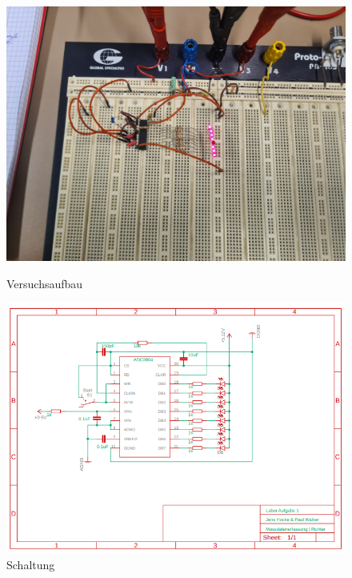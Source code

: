 \documentclass[12pt, a4paper, ngerman]{article}
\begin{document}
\begin{figure}%
  \centering
  \begin{minipage}[b]{0.49\textwidth}
    \includegraphics[width=\textwidth]{versuch_1_versuchsaufbau.jpeg}
    \caption{Versuchsaufbau}
    \label{abb:aufbau1}
  \end{minipage}
  \hfill
  \begin{minipage}[b]{0.49\textwidth}
    \includegraphics[width=\textwidth]{Schaltplan_Versuch_1.PNG}
    \caption{Schaltung}
    \label{abb:schaltung1}
  \end{minipage}
\end{figure}
\end{document}
